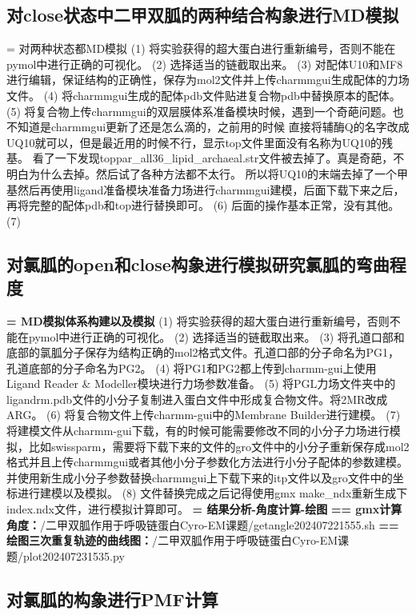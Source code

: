 \subsection{对close状态中二甲双胍的两种结合构象进行MD模拟}
\noindent = 对两种状态都MD模拟
\newline\indent (1) 将实验获得的超大蛋白进行重新编号，否则不能在pymol中进行正确的可视化。
(2) 选择适当的链截取出来。
(3) 对配体U10和MF8进行编辑，保证结构的正确性，保存为mol2文件并上传charmmgui生成配体的力场文件。
(4) 将charmmgui生成的配体pdb文件贴进复合物pdb中替换原本的配体。
(5) 将复合物上传charmmgui的双层膜体系准备模块时候，遇到一个奇葩问题。也不知道是charmmgui更新了还是怎么滴的，之前用的时候
直接将辅酶Q的名字改成UQ10就可以，但是最近用的时候不行，显示top文件里面没有名称为UQ10的残基。
看了一下发现toppar\_all36\_lipid\_archaeal.str文件被去掉了。真是奇葩，不明白为什么去掉。然后试了各种方法都不太行。
所以将UQ10的末端去掉了一个甲基然后再使用ligand准备模块准备力场进行charmmgui建模，后面下载下来之后，再将完整的配体pdb和top进行替换即可。
(6) 后面的操作基本正常，没有其他。
(7) 
\subsection{对氯胍的open和close构象进行模拟研究氯胍的弯曲程度}
\noindent\textbf{= MD模拟体系构建以及模拟}
\newline (1) 将实验获得的超大蛋白进行重新编号，否则不能在pymol中进行正确的可视化。
(2) 选择适当的链截取出来。
(3) 将孔道口部和底部的氯胍分子保存为结构正确的mol2格式文件。孔道口部的分子命名为PG1，孔道底部的分子命名为PG2。
(4) 将PG1和PG2都上传到charmm-gui上使用Ligand Reader \& Modeller模块进行力场参数准备。
(5) 将PGL力场文件夹中的ligandrm.pdb文件的小分子复制进入蛋白文件中形成复合物文件。将2MR改成ARG。
(6) 将复合物文件上传charmm-gui中的Membrane Builder进行建模。
(7) 将建模文件从charmm-gui下载，有的时候可能需要修改不同的小分子力场进行模拟，比如swissparm，需要将下载下来的文件的gro文件中的小分子重新保存成mol2格式并且上传charmmgui或者其他小分子参数化方法进行小分子配体的参数建模。
并使用新生成小分子参数替换charmmgui上下载下来的itp文件以及gro文件中的坐标进行建模以及模拟。
(8) 文件替换完成之后记得使用gmx make\_ndx重新生成下index.ndx文件，进行模拟计算即可。
\newline\textbf{= 结果分析-角度计算-绘图}
\newline\textbf{== gmx计算角度：}/二甲双胍作用于呼吸链蛋白Cyro-EM课题/getangle202407221555.sh
\newline\textbf{== 绘图三次重复轨迹的曲线图：}/二甲双胍作用于呼吸链蛋白Cyro-EM课题/plot202407231535.py
\subsection{对氯胍的构象进行PMF计算}
